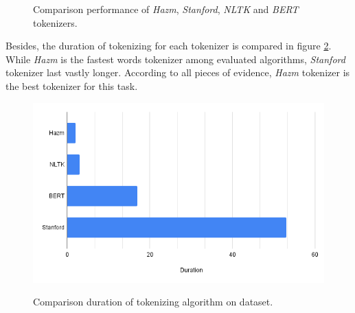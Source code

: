 \begin{figure}%
	\centering
	\qquad
	\qquad
	\caption{Comparison performance of \textit{Hazm}, \textit{Stanford}, \textit{NLTK} and \textit{BERT} tokenizers.}%
	\label{fig:tekenres}%
\end{figure}

Besides, the duration of tokenizing for each tokenizer is compared in figure \ref{fig:tokentime}. While \textit{Hazm} is the fastest words tokenizer among evaluated algorithms, \textit{Stanford} tokenizer last vastly longer. According to all pieces of evidence, \textit{Hazm} tokenizer is the best tokenizer for this task.

\begin{figure}%
	\centering
	{\includegraphics[width=12.5cm]{statistics/tokenizer/duration.png} }
	\caption{Comparison duration of tokenizing algorithm on \cite{stance_persian} dataset.}%
	\label{fig:tokentime}%
\end{figure}


